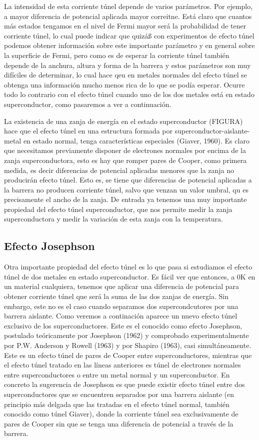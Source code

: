 La intensidad de esta corriente túnel depende de varios parámetros. Por ejemplo, a mayor diferencia de potencial aplicada mayor correitne. Está claro que cuantos más estados tengamos en el nivel de Fermi mayor será la probabilidad de tener corriente túnel, lo cual puede indicar que quizáß con experimentos de efecto túnel podemos obtener información sobre este importante parámetro y en general sobre la superficie de Fermi, pero como es de esperar la corriente túnel también depende de la anchura, altura y forma de la barrera y estos parámetros son muy difíciles de determinar, lo cual hace qeu en metales normales del efecto túnel se obtenga una información mucho menos rica de lo que se podía esperar. Ocurre todo lo contrario con el efecto túnel cuando uno de los dos metales está en estado superconductor, como pasaremos a ver a continuación.

La existencia de una zanja de energía en el estado superconductor (FIGURA) hace que el efecto túnel en una estructura formada por superconductor-aislante-metal en estado normal, tenga características especiales (Giaver, 1960). Es claro que necesitamos previamente disponer de electrones normales por encima de la zanja superconductora, esto es hay que romper pares de Cooper, como primera medida, es decir diferencias de potencial aplicadas menores que la zanja no producirán efecto túnel. Esto es, se tiene que diferencias de potencial aplicadas a la barrera no producen corriente túnel, salvo que venzan un valor umbral, qu es precisamente el ancho de la zanja. De entrada ya tenemos una muy importante propiedad del efecto túnel superconductor, que nos permite medir la zanja superconductora y medir la variación de esta zanja con la temperatura.

\subsection{Efecto Josephson}

Otra importante propiedad del efecto túnel es lo que pasa si estudiamos el efecto túnel de dos metales en estado superconductor. Es fácil ver que entonces, a 0K en un material cualquiera, tenemos que aplicar una diferencia de potencial para obtener corriente túnel que será la suma de las dos zanjas de energía. Sin embargo, este no es el caso cuando separamos dos supercondcutores por una barrera aislante. Como veremos a continación aparece un nuevo efecto túnel exclusivo de los superconductores. Este es el conocido como efecto Josephson, postulado teóricamente por Josephson (1962) y comprobado experimentalmente por P.W. Anderson y Rowell (1963) y por Shapiro (1963), casi simultáneamente. Este es un efecto túnel de pares de Cooper entre superconductores, mientras que el efecto túnel tratado en las líneas anteriores es túnel de electrones normales entre superconductores o entre un metal normal y un superconductor. En concreto la sugerencia de Josephson es que puede existir efecto túnel entre dos superconductores que se encuentren separados por una barrera aislante (en principio más delgada que las tratadas en el efecto túnel normal, también conocido como túnel Giaver), donde la corriente túnel sea exclusivamente de pares de Cooper sin que se tenga una diferencia de potencial a través de la barrera.

